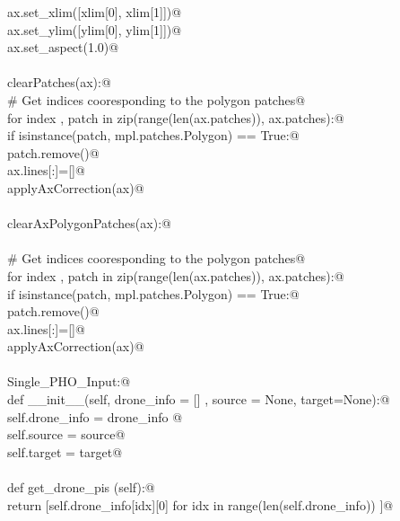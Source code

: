 \documentclass[10pt, english, oneside]{report}
\begin{document}
\begin{appendices}
\begin{flushleft}
\begin{list}{}{}
\mbox{}\verb@      ax.set_xlim([xlim[0], xlim[1]])@\\
\mbox{}\verb@      ax.set_ylim([ylim[0], ylim[1]])@\\
\mbox{}\verb@      ax.set_aspect(1.0)@\\
\mbox{}\verb@@\\
\mbox{}\verb@def clearPatches(ax):@\\
\mbox{}\verb@    # Get indices cooresponding to the polygon patches@\\
\mbox{}\verb@    for index , patch in zip(range(len(ax.patches)), ax.patches):@\\
\mbox{}\verb@        if isinstance(patch, mpl.patches.Polygon) == True:@\\
\mbox{}\verb@            patch.remove()@\\
\mbox{}\verb@    ax.lines[:]=[]@\\
\mbox{}\verb@    applyAxCorrection(ax)@\\
\mbox{}\verb@@\\
\mbox{}\verb@def clearAxPolygonPatches(ax):@\\
\mbox{}\verb@@\\
\mbox{}\verb@    # Get indices cooresponding to the polygon patches@\\
\mbox{}\verb@    for index , patch in zip(range(len(ax.patches)), ax.patches):@\\
\mbox{}\verb@        if isinstance(patch, mpl.patches.Polygon) == True:@\\
\mbox{}\verb@            patch.remove()@\\
\mbox{}\verb@    ax.lines[:]=[]@\\
\mbox{}\verb@    applyAxCorrection(ax)@\\
\mbox{}\verb@@\\
\mbox{}\verb@class Single_PHO_Input:@\\
\mbox{}\verb@    def __init__(self, drone_info = [] , source = None, target=None):@\\
\mbox{}\verb@           self.drone_info = drone_info @\\
\mbox{}\verb@           self.source     = source@\\
\mbox{}\verb@           self.target     = target@\\
\mbox{}\verb@@\\
\mbox{}\verb@    def get_drone_pis (self):@\\
\mbox{}\verb@           return [self.drone_info[idx][0] for idx in range(len(self.drone_info)) ]@\\

\end{list}
\end{flushleft}
\end{appendices}
\end{document}
